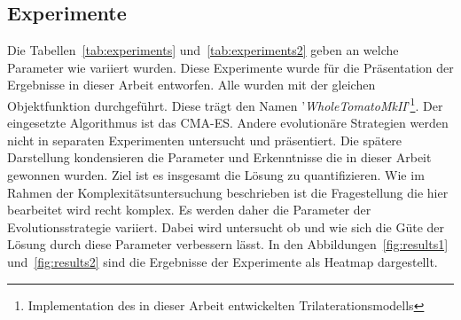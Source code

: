 \subsection{Experimente}
%
Die Tabellen~\ref{tab:experiments} und~\ref{tab:experiments2} geben an welche Parameter wie variiert wurden. Diese Experimente wurde für die Präsentation der Ergebnisse in dieser Arbeit entworfen. Alle wurden mit der gleichen Objektfunktion durchgeführt. Diese trägt den Namen '\textit{WholeTomatoMkII}'\footnote{Implementation des in dieser Arbeit entwickelten Trilaterationsmodells}. Der eingesetzte Algorithmus ist das CMA-ES. Andere evolutionäre Strategien werden nicht in separaten Experimenten untersucht und präsentiert. Die spätere Darstellung kondensieren die Parameter und Erkenntnisse die in dieser Arbeit gewonnen wurden. Ziel ist es insgesamt die Lösung zu quantifizieren. Wie im Rahmen der Komplexitätsuntersuchung beschrieben ist die Fragestellung die hier bearbeitet wird recht komplex. Es werden daher die Parameter der Evolutionsstrategie variiert. Dabei wird untersucht ob und wie sich die Güte der Lösung durch diese Parameter verbessern lässt. In den Abbildungen~\ref{fig:results1} und~\ref{fig:results2} sind die Ergebnisse der Experimente als Heatmap dargestellt.

